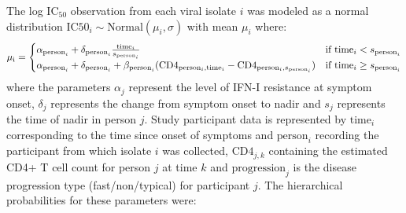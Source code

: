 \documentclass[12pt]{article}
\newcommand{\icFifty}{IC$_{50}$}
\begin{document}
 The log \icFifty{} observation from each viral isolate $i$ was modeled as a normal distribution $\text{IC50}_i\sim\text{Normal}(\mu_i,\sigma)$ with mean $\mu_i$ where:
\begin{align*}
  \rm
  \mu_i=\begin{cases} 
    \alpha_{\text{person}_i}+\delta_{\text{person}_i}\frac{\text{time}_i}{s_{\text{person}_i}} & \text{if } \text{time}_i<s_{\text{person}_i}\\
    \alpha_{\text{person}_i}+\delta_{\text{person}_i} + \beta_{\text{person}_i}(\text{CD4}_{\text{person$_i$},\text{time}_i}-\text{CD4}_{\text{person$_i$},s_\text{person$_i$}}) & \text{if } \text{time}_i\ge s_{\text{person}_i}\\
  \end{cases}
\end{align*}
where the parameters $\alpha_j$ represent the level of IFN-I resistance at symptom onset, $\delta_j$ represents the change from symptom onset to nadir and $s_j$ represents the time of nadir in person $j$. Study participant data is represented by $\text{time}_i$ corresponding to the time since onset of symptoms and $\text{person}_i$ recording the participant from which isolate $i$ was collected, $\text{CD4}_{j,k}$ containing the estimated CD4+ T cell count for person $j$ at time $k$ and $\text{progression}_j$ is the disease progression type (fast/non/typical) for participant $j$. The hierarchical probabilities for these parameters were:
\end{document}
